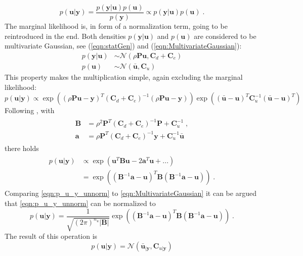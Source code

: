 \documentclass[%
  a4paper,oneside,%
  11pt,%
  smallchapters,
  style=printdev,
  extramargin,
  green,%
  rgb, <cmyk>
  ]{tubsbook}
\begin{document}
\begin{equation}
p(\bm{u}|\bm{y}) = \frac{p(\bm{y}|\bm{u})p(\bm{u})}{p(\bm{y})} \propto p(\bm{y}|\bm{u})p(\bm{u}) \;.
\label{eqn:bayesPrior}
\end{equation}
The marginal likelihood is, in form of a normalization term, going to be reintroduced in the end. Both densities $p(\bm{y}|\bm{u})$ and $p(\bm{u})$ are considered to be multivariate Gaussian, see (\ref{eqn:statGen}) and (\ref{eqn:MultivariateGaussian}):
\begin{align}
p(\bm{y}|\bm{u}) &\sim \mathcal{N} (\rho \bm{P} \bm{u}, \bm{C}_d + \bm{C}_e) \\
p(\bm{u}) &\sim \mathcal{N}(\bm{\bar{u}},\bm{C}_u)
\end{align}
%
This property makes the multiplication simple, again excluding the marginal likelihood:
\begin{equation}
p(\bm{u}|\bm{y}) \propto  \exp(  (\rho \bm{P} \bm{u} -\bm{y})^T (\bm{C}_d + \bm{C}_e)^{-1} (\rho \bm{P} \bm{u} -\bm{y})  ) \exp(  (\bar{\bm{u}} - \bm{u})^T \bm{C}_u^{-1}  (\bar{\bm{u}} - \bm{u})^T) 
\end{equation}
Following \cite{girolami2021}, with
\begin{align}
\begin{split}
\bm{B} &= \rho^2 \bm{P}^T (\bm{C}_d +\bm{C}_e)^{-1} \bm{P} + \bm{C}_u^{-1}\;, \\
\bm{a} &= \rho \bm{P}^T (\bm{C}_d +\bm{C}_e)^{-1} \bm{y} + \bm{C}_u^{-1} \bm{\bar{u}} 
\end{split}
\end{align}
there holds
\begin{align}
\begin{split}
p(\bm{u}|\bm{y}) &\propto \exp(\bm{u}^T \bm{B} \bm{u} - 2\bm{a}^T\bm{u} + ... ) \\
&= \exp( (\bm{B}^{-1} \bm{a} - \bm{u} )^T  \bm{B} (\bm{B}^{-1} \bm{a} - \bm{u} ) ) \;.
\label{eqn:p_u_y_unnorm}
\end{split}
\end{align}
Comparing \eqref{eqn:p_u_y_unnorm} to \eqref{eqn:MultivariateGaussian} it can be argued that \eqref{eqn:p_u_y_unnorm} can be normalized to 
\begin{equation}
p(\bm{u}|\bm{y}) = \frac{1}{\sqrt{(2\pi)^{n_u} \lvert \bm{B} \rvert}} \exp( (\bm{B}^{-1} \bm{a} - \bm{u} )^T  \bm{B} (\bm{B}^{-1} \bm{a} - \bm{u} ) ) \;.
\end{equation} 
%
The result of this operation is
%
\begin{equation}
p(\bm{u}|\bm{y}) = \mathcal{N}(\bar{\bm{u}}_{|\bm{y}}, \bm{C}_{u|\bm{y}})
\label{eqn:statFEMConditioned}
\end{equation}
\end{document}
